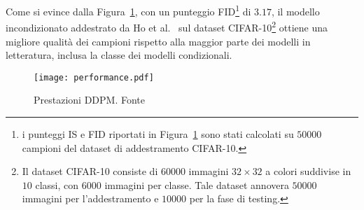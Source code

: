 \noindent
Come si evince dalla Figura~\ref{fig:performance}, con un punteggio FID\footnote{i punteggi IS e FID riportati in Figura~\ref{fig:performance} sono stati calcolati su $50000$ campioni del dataset di addestramento CIFAR-10.} di $3.17$, 
il modello incondizionato addestrato da Ho et al.~\cite{ho2020} sul dataset CIFAR-10\footnote{Il dataset CIFAR-10 consiste di $60000$ immagini $32\times32$ a colori suddivise in 
$10$ classi, con $6000$ immagini per classe. Tale dataset annovera $50000$ immagini per l'addestramento e $10000$ per la fase di testing.} 
ottiene una migliore qualità dei campioni rispetto alla maggior parte dei modelli in letteratura, inclusa la classe dei modelli condizionali.



\begin{figure}[tp]
\centering
\texttt{[image: performance.pdf]}
\caption{Prestazioni DDPM. Fonte~\cite{ho2020}}\label{fig:performance}
\end{figure}